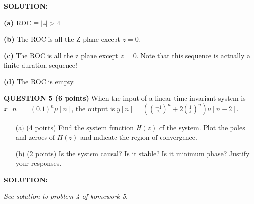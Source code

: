\documentclass[a4paper,11pt,oneside]{article}
\begin{document}
\vspace{1cm}

\textbf{SOLUTION:} 

\textbf{(a)} $\textrm{ROC}\equiv |z|>4$

\textbf{(b)} The ROC is all the Z plane except $z=0$. 

\textbf{(c)} The ROC is all the z plane except $z=0$. Note that this sequence is actually a finite duration sequence!

\textbf{(d)} The ROC is empty.




\vspace{1cm}

\textbf{QUESTION 5 (6 points)} When the input of a linear time-invariant system is $x[n]=(0.1)^n\mu[n]$, the output is $y[n]=\left(\left(\frac{-1}{3}\right)^n+2\left(\frac{1}{4}\right)^n\right)\mu[n-2]$. 

\begin{itemize}
\item[(a)](4 points) Find the system function $H(z)$ of the system. Plot the poles and zeroes of $H(z)$ and indicate the region of convergence.
\item[(b)] (2 points) Is the system causal? Is it stable? Is it minimum phase? Justify your responses.
\end{itemize} 



\vspace{1cm}

\textbf{SOLUTION:} 

\emph{See solution to problem 4 of homework 5}.
\end{document}
